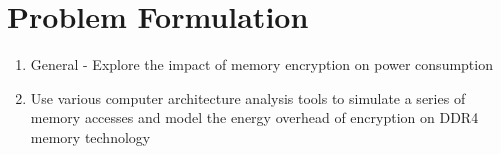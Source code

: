 \section{Problem Formulation}
\label{sec-problem}

\begin{enumerate}
  \item General - Explore the impact of memory encryption on power consumption
  \item Use various computer architecture analysis tools to simulate a series
    of memory accesses and model the energy overhead of encryption on DDR4
    memory technology
\end{enumerate}



